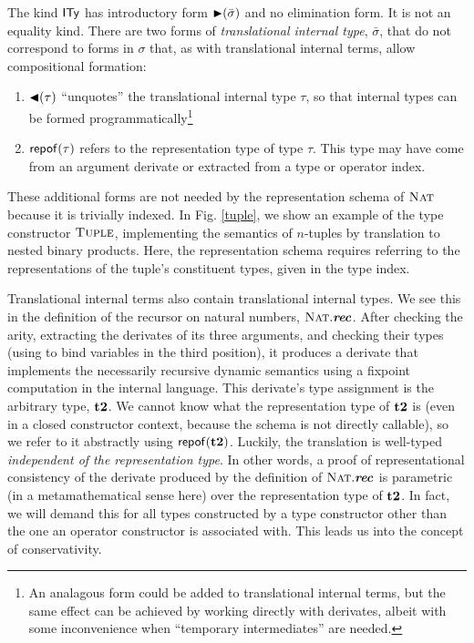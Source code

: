 \documentclass[9pt,preprint]{sigplanconf}
\begin{document}
The kind $\textsf{ITy}$ has introductory form ${\blacktriangleright}(\bar \sigma)$ and no elimination form. It is not an equality kind. There are two forms of \emph{translational internal type}, $\bar \sigma$, that do not correspond to forms in $\sigma$ that, as with translational internal terms, allow  compositional formation:
\begin{enumerate}
\item ${\blacktriangleleft}(\tau)$ ``unquotes'' the translational internal type $\tau$, so that internal types can be formed programmatically\footnote{An analagous form could be added to translational internal terms, but the same effect can be achieved by working directly with derivates, albeit with some inconvenience when ``temporary intermediates'' are needed.} 
\item ${\sf repof}(\tau)$ refers to the representation type of type $\tau$. This type may have come from an argument derivate or extracted from a type or operator index.
\end{enumerate}

These additional forms are not needed by the representation schema of $\textsc{Nat}$  because it is trivially indexed. In Fig. \ref{tuple}, we show an example of the type constructor $\textsc{Tuple}$, implementing the semantics of $n$-tuples by translation to nested binary products. Here, the representation schema requires referring to the representations of the tuple's constituent types, given in the type index.

Translational internal terms also contain translational internal types. We see this in the definition of the recursor on natural numbers, $\textsc{Nat}.\textbf{\textit{rec}}$. After checking the arity, extracting the derivates of its three arguments, and checking their types (using  to bind variables in the third position), it produces a derivate that implements the necessarily recursive dynamic semantics using a fixpoint computation in the internal language. This derivate's type assignment is the arbitrary type, ${\textbf{t2}}$. We cannot know what the representation type of ${\textbf{t2}}$ is (even in a closed constructor context, because the schema is not directly callable), so we refer to it abstractly using ${\sf repof}({\textbf{t2}})$. Luckily, the translation is well-typed \emph{independent of the representation type}. In other words, a proof of representational consistency of the derivate produced by the definition of $\textsc{Nat}.\textbf{\textit{rec}}$ is parametric (in a metamathematical sense here) over the representation type of ${\textbf{t2}}$. In fact, we will demand this for all types constructed by a type constructor other than the one an operator constructor is associated with. This leads us into the concept of conservativity.
\end{document}
